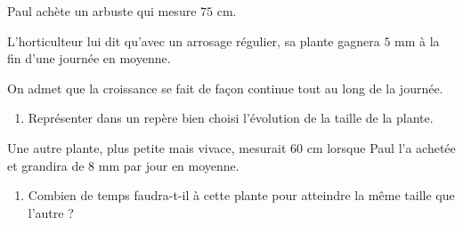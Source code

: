 \begin{exo}{}
	Paul achète un arbuste qui mesure $75\text{ cm}$.

	L'horticulteur lui dit qu'avec un arrosage régulier, sa plante gagnera $5\text{ mm}$ à la fin d'une journée en moyenne.

	On admet que la croissance se fait de façon continue tout au long de la journée.

	\begin{enumerate}
		\item Représenter dans un repère bien choisi l'évolution de la taille de la plante.
	\end{enumerate}
	Une autre plante, plus petite mais vivace, mesurait $60\text{ cm}$ lorsque Paul l'a achetée et grandira de $8\text{ mm}$ par jour en moyenne.
	\begin{enumerate}[resume]
		\item Combien de temps faudra-t-il à cette plante pour atteindre la même taille que l'autre ?
	\end{enumerate}
\end{exo}
